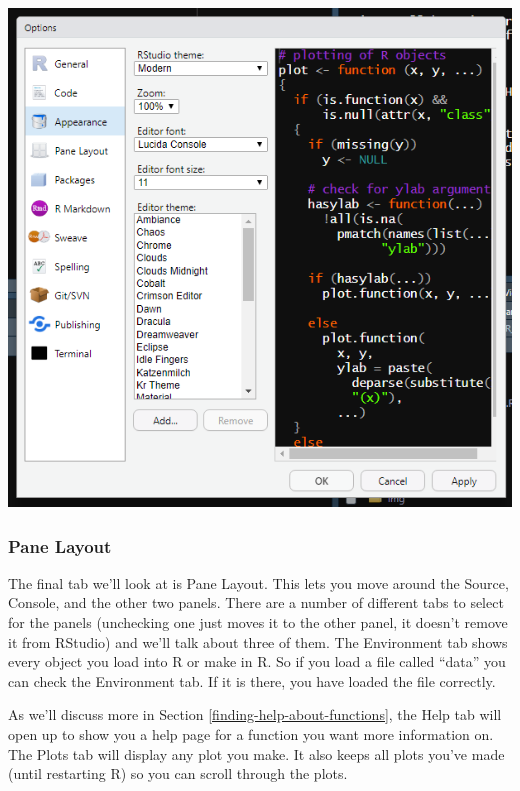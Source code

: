 \documentclass[
  12pt,
]{book}
\begin{document}
\includegraphics{images/rstudio_8.PNG}

\hypertarget{pane-layout}{%
\subsubsection{Pane Layout}\label{pane-layout}}

The final tab we'll look at is Pane Layout. This lets you move around the Source, Console, and the other two panels. There are a number of different tabs to select for the panels (unchecking one just moves it to the other panel, it doesn't remove it from RStudio) and we'll talk about three of them. The Environment tab shows every object you load into R or make in R. So if you load a file called ``data'' you can check the Environment tab. If it is there, you have loaded the file correctly.

As we'll discuss more in Section \ref{finding-help-about-functions}, the Help tab will open up to show you a help page for a function you want more information on. The Plots tab will display any plot you make. It also keeps all plots you've made (until restarting R) so you can scroll through the plots.
\end{document}
